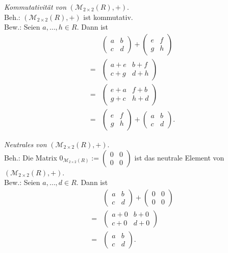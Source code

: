 \documentclass[12pt,a4paper]{article}
\begin{document}
\begin{enumerate}[(a)]
    \textit{Kommutativität von} $(\mathcal{M}_{2\times2}(R), +)$.\\
    Beh.: $(\mathcal{M}_{2\times2}(R), +)$ ist kommutativ.\\
    Bew.: Seien $a,\dots,h \in R$.
    Dann ist
    \begin{align*}
        &\begin{pmatrix}
        a & b\\ c & d
        \end{pmatrix} + \begin{pmatrix}
        e & f\\ g & h
        \end{pmatrix}\\
        = &\begin{pmatrix}
        a + e & b + f\\ c + g & d + h
        \end{pmatrix}\\
        = &\begin{pmatrix}
        e+a & f+b\\ g+c & h+d
        \end{pmatrix}\\
        = &\begin{pmatrix}
        e & f\\ g & h
        \end{pmatrix} + \begin{pmatrix}
        a & b\\ c & d
        \end{pmatrix}.
    \end{align*}

    \textit{Neutrales von} $(\mathcal{M}_{2\times2}(R), +)$.\\
    Beh.: Die Matrix $0_{\mathcal{M}_{2\times2}(R)} := \begin{pmatrix}
    0&0\\0&0
    \end{pmatrix}$ ist das neutrale Element von $(\mathcal{M}_{2\times2}(R), +)$.\\
    Bew.: Seien $a,\dots,d \in R$.
    Dann ist
    \begin{align*}
        &\begin{pmatrix}
        a & b\\ c & d
        \end{pmatrix} + \begin{pmatrix}
        0&0\\0&0
        \end{pmatrix}\\
        = &\begin{pmatrix}
        a+0&b+0\\c+0&d+0
        \end{pmatrix}\\
        = &\begin{pmatrix}
        a&b\\c&d
        \end{pmatrix}.
    \end{align*}


\end{enumerate}
\end{document}
